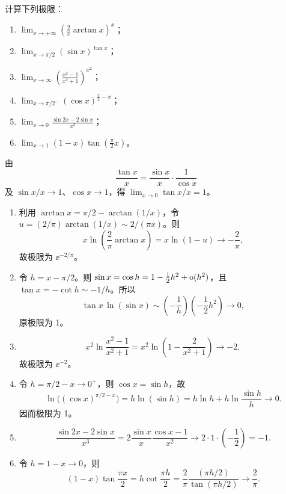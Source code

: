 \begin{xexercise}[1]
计算下列极限：
  \begin{enumerate}
    \item $\displaystyle\lim_{x\to+\infty}\left(\frac2\pi\arctan x\right)^x$；
    \item $\displaystyle\lim_{x\to\pi/2}(\sin x)^{\tan x}$；
    \item $\displaystyle\lim_{x\to\infty}\left(\frac{x^2-1}{x^2+1}\right)^{x^2}$；
    \item $\displaystyle\lim_{x\to\pi/2^-}(\cos x)^{\frac\pi2-x}$；
    \item $\displaystyle\lim_{x\to0}\frac{\sin2x-2\sin x}{x^3}$；
    \item $\displaystyle\lim_{x\to1}(1-x)\tan\left(\frac\pi2x\right)$。
  \end{enumerate}
\end{xexercise}
\begin{xsolution}
由
\[
  \frac{\tan x}{x}=\frac{\sin x}{x}\cdot\frac1{\cos x}
\]
及 $\sin x/x\to1$、$\cos x\to1$，得
$\lim_{x\to0}\tan x/x=1$。

\begin{enumerate}[label=(\arabic*)]
  \item 利用 $\arctan x=\pi/2-\arctan(1/x)$，令
  $u=(2/\pi)\arctan(1/x)\sim2/(\pi x)$。则
  \[
    x\ln\left(\frac2\pi\arctan x\right)
    =x\ln(1-u)\to-\frac2\pi,
  \]
  故极限为 $\ee^{-2/\pi}$。

  \item 令 $h=x-\pi/2$。则
  $\sin x=\cos h=1-\frac12h^2+\mathrm{o}(h^2)$，且
  $\tan x=-\cot h\sim-1/h$。所以
  \[
    \tan x\,\ln(\sin x)
    \sim\left(-\frac1h\right)\left(-\frac12h^2\right)\to0,
  \]
  原极限为 1。

  \item
  \[
    x^2\ln\frac{x^2-1}{x^2+1}
    =x^2\ln\left(1-\frac2{x^2+1}\right)\to-2,
  \]
  故极限为 $\ee^{-2}$。

  \item 令 $h=\pi/2-x\to0^+$，则 $\cos x=\sin h$，故
  \[
    \ln\bigl((\cos x)^{\pi/2-x}\bigr)=h\ln(\sin h)
    =h\ln h+h\ln\frac{\sin h}{h}\to0.
  \]
  因而极限为 1。

  \item
  \[
    \frac{\sin2x-2\sin x}{x^3}
    =2\frac{\sin x}{x}\frac{\cos x-1}{x^2}\to2\cdot1\cdot\left(-\frac12\right)=-1.
  \]

  \item 令 $h=1-x\to0$，则
  \[
    (1-x)\tan\frac{\pi x}{2}
    =h\cot\frac{\pi h}{2}
    =\frac2\pi\frac{(\pi h/2)}{\tan(\pi h/2)}\to\frac2\pi.
  \]
\end{enumerate}
\end{xsolution}


